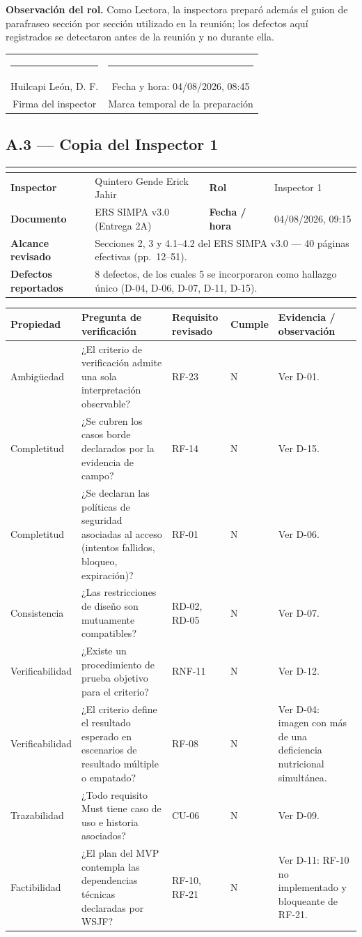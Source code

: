 \documentclass[11pt,letterpaper]{article}
\makeatletter
\newcommand{\ficha}[5]{%
\begin{center}\small
\begin{tabularx}{\textwidth}{|>{\bfseries}p{3.2cm}|X|>{\bfseries}p{2.6cm}|p{4.2cm}|}
\hline
\rowcolor{gris}\multicolumn{4}{|l|}{\bfseries Lista de verificación de inspección --- Anexo A (ISO/IEC/IEEE 29148:2018, §6.4)}\\
\hline
Inspector & #1 & Rol & #2 \\
\hline
Documento & ERS SIMPA v3.0 (Entrega 2A) & Fecha / hora & #3 \\
\hline
Alcance revisado & \multicolumn{3}{p{12.6cm}|}{#4} \\
\hline
Defectos reportados & \multicolumn{3}{p{12.6cm}|}{#5} \\
\hline
\end{tabularx}
\end{center}}
\newcommand{\cabecera}{%
\rowcolor{gris}\textbf{Propiedad} & \textbf{Pregunta de verificación} & \textbf{Requisito revisado} & \textbf{Cumple} & \textbf{Evidencia / observación}\\}
\newcommand{\firma}[2]{%
\vspace{0.5cm}
\begin{center}
\begin{tabular}{c@{\hspace{2.5cm}}c}
\rule{6cm}{0.4pt} & \rule{5cm}{0.4pt}\\
{\small #1} & {\small Fecha y hora: #2}\\
{\small Firma del inspector} & {\small Marca temporal de la preparación}\\
\end{tabular}
\end{center}}
\makeatother
\begin{document}
\small \textbf{Observación del rol.} Como Lectora, la inspectora preparó además el guion de
parafraseo sección por sección utilizado en la reunión; los defectos aquí registrados se
detectaron antes de la reunión y no durante ella.
\normalsize

\firma{Huilcapi León, D. F.}{04/08/2026, 08:45}

\clearpage

\subsection*{A.3 --- Copia del Inspector 1}
\ficha{Quintero Gende Erick Jahir}{Inspector 1}{04/08/2026, 09:15}
{Secciones 2, 3 y 4.1--4.2 del ERS SIMPA v3.0 --- 40 páginas efectivas (pp.\ 12--51).}
{8 defectos, de los cuales 5 se incorporaron como hallazgo único (D-04, D-06, D-07, D-11, D-15).}

\begin{center}\footnotesize
\begin{tabularx}{\textwidth}{P{2.0cm} X P{2.5cm} C{1.2cm} P{3.2cm}}
\toprule
\cabecera
\midrule
Ambigüedad & ¿El criterio de verificación admite una sola interpretación observable? & RF-23 & N & Ver D-01.\\
Completitud & ¿Se cubren los casos borde declarados por la evidencia de campo? & RF-14 & N & Ver D-15.\\
Completitud & ¿Se declaran las políticas de seguridad asociadas al acceso (intentos fallidos, bloqueo, expiración)? & RF-01 & N & Ver D-06.\\
Consistencia & ¿Las restricciones de diseño son mutuamente compatibles? & RD-02, RD-05 & N & Ver D-07.\\
Verificabilidad & ¿Existe un procedimiento de prueba objetivo para el criterio? & RNF-11 & N & Ver D-12.\\
Verificabilidad & ¿El criterio define el resultado esperado en escenarios de resultado múltiple o empatado? & RF-08 & N & Ver D-04: imagen con más de una deficiencia nutricional simultánea.\\
Trazabilidad & ¿Todo requisito Must tiene caso de uso e historia asociados? & CU-06 & N & Ver D-09.\\
Factibilidad & ¿El plan del MVP contempla las dependencias técnicas declaradas por WSJF? & RF-10, RF-21 & N & Ver D-11: RF-10 no implementado y bloqueante de RF-21.\\
\bottomrule
\end{tabularx}
\end{center}
\end{document}
